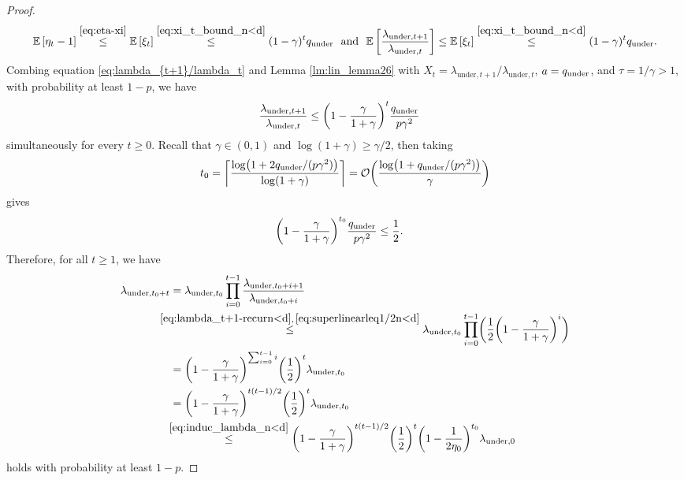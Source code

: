 \documentclass[11pt]{article}
\theoremstyle{plain}
\theoremstyle{definition}
\theoremstyle{remark}
\theoremstyle{plain}
\def\OM{{\mathcal O}}
\def\EB{{\mathbb E}}
\def \EBP #1{\EB\left[#1\right]}
\begin{document}
\begin{proof}
\begin{align}
\EBP{\eta_t-1}
\overset{\eqref{eq:eta-xi}}\leq\EBP{\xi_t}
\overset{\eqref{eq:xi_t_bound_n<d}}{\leq}
(1-\gamma)^tq_{\text{\rm under}}
~~\text{and}~~
\EBP{\frac{\lambda_{\mathrm{under},t+1}}{\lambda_{\mathrm{under},t}}}\leq\EBP{\xi_t}
\overset{\eqref{eq:xi_t_bound_n<d}}{\leq}
(1-\gamma)^tq_{\text{\rm under}}.
\end{align}
Combing equation \eqref{eq:lambda_{t+1}/lambda_t} and Lemma \ref{lm:lin_lemma26} with
$X_t=\lambda_{\mathrm{under},t+1}/\lambda_{\mathrm{under},t}$,
$a=q_{\text{\rm under}}$, and $\tau=1/\gamma>1$, with probability at least $1-p$, we have
\begin{align}
\label{eq:lambda_t+1-recurn<d}
\frac{\lambda_{\mathrm{under},t+1}}{\lambda_{\mathrm{under},t}}
&\leq \biggl(1-\frac{\gamma}{1+\gamma}\biggr)^t\frac{q_{\text{\rm under}}}{p\gamma^2}
\end{align}
simultaneously for every $t\geq0$.
Recall that $\gamma\in(0,1)$ and $\log(1+\gamma)\geq\gamma/2$, then taking
\begin{align*}
t_0
=\biggl\lceil
\frac{\log\bigl(1+2q_{\text{\rm under}}/(p\gamma^2)\bigr)}{\log(1+\gamma)}
\biggr\rceil=\OM\biggl(\frac{\log\bigl(1+q_{\text{\rm under}}/(p\gamma^2)\bigr)}{\gamma}\biggr)
\end{align*}
gives
\begin{align}\label{eq:superlinearleq1/2n<d}
\biggl(1-\frac{\gamma}{1+\gamma}\biggr)^{t_0}\frac{q_{\text{\rm under}}}{p\gamma^2}
&\leq\frac{1}{2}.
\end{align}
Therefore, for all $t\geq1$, we have
\begin{align*}
\lambda_{\mathrm{under},t_0+t}
&=\lambda_{\mathrm{under},t_0}
\prod_{i=0}^{t-1}
\frac{\lambda_{\mathrm{under},t_0+i+1}}
{\lambda_{\mathrm{under},t_0+i}}\\
&\!\!\!\!\!\!\!\overset{\eqref{eq:lambda_t+1-recurn<d},\, \eqref{eq:superlinearleq1/2n<d}}{\leq}\lambda_{\mathrm{under},t_0}
\prod_{i=0}^{t-1}
\biggl(\frac{1}{2}
\biggl(1-\frac{\gamma}{1+\gamma}\biggr)^i\biggr)\\
&=\biggl(1-\frac{\gamma}{1+\gamma}\biggr)^{\sum_{i=0}^{t-1}i}
\biggl(\frac{1}{2}\biggr)^t\lambda_{\mathrm{under},t_0}\\
&=\biggl(1-\frac{\gamma}{1+\gamma}\biggr)^{t(t-1)/2}
\biggl(\frac{1}{2}\biggr)^t\lambda_{\mathrm{under},t_0}\\
&\!\!\overset{\eqref{eq:induc_lambda_n<d}}{\leq}
\biggl(1-\frac{\gamma}{1+\gamma}\biggr)^{t(t-1)/2}
 \biggl(\frac{1}{2}\biggr)^t
 \biggl(1-\frac{1}{2\eta_0}\biggr)^{t_0}\lambda_{\mathrm{under},0}
\end{align*}
holds with probability at least $1-p$.
\end{proof}
\end{document}
